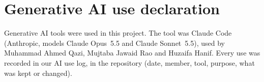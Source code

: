 \section{Generative AI use declaration}
\label{app:ai-use}

Generative AI tools were used in this project. The tool was Claude Code (Anthropic, models
Claude Opus~5.5 and Claude Sonnet~5.5), used by Muhammad Ahmed Qazi, Mujtaba Jawaid Rao and
Huzaifa Hanif. Every use was recorded in our AI use log,  in the
repository (date, member, tool, purpose, what was kept or changed).


